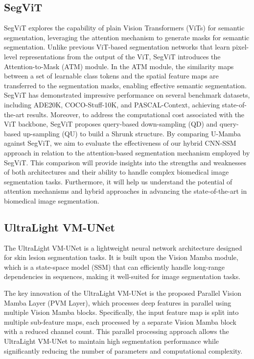\documentclass[conference]{IEEEtran}
\begin{document}
\subsection{SegViT}
SegViT \cite{zhang2022segvit} explores the capability of plain Vision Transformers (ViTs) \cite{dosovitskiy2021image} for semantic segmentation, leveraging the attention mechanism to generate masks for semantic segmentation. Unlike previous ViT-based segmentation networks that learn pixel-level representations from the output of the ViT, SegViT introduces the Attention-to-Mask (ATM) module. In the ATM module, the similarity maps between a set of learnable class tokens and the spatial feature maps are transferred to the segmentation masks, enabling effective semantic segmentation.
SegViT has demonstrated impressive performance on several benchmark datasets, including ADE20K, COCO-Stuff-10K, and PASCAL-Context, achieving state-of-the-art results. Moreover, to address the computational cost associated with the ViT backbone, SegViT proposes query-based down-sampling (QD) and query-based up-sampling (QU) to build a Shrunk structure. By comparing U-Mamba against SegViT, we aim to evaluate the effectiveness of our hybrid CNN-SSM approach in relation to the attention-based segmentation mechanism employed by SegViT. This comparison will provide insights into the strengths and weaknesses of both architectures and their ability to handle complex biomedical image segmentation tasks. Furthermore, it will help us understand the potential of attention mechanisms and hybrid approaches in advancing the state-of-the-art in biomedical image segmentation.

\subsection{UltraLight VM-UNet}
The UltraLight VM-UNet \cite{ultralightvmunet} is a lightweight neural network architecture designed for skin lesion segmentation tasks. It is built upon the Vision Mamba module, which is a state-space model (SSM) that can efficiently handle long-range dependencies in sequences, making it well-suited for image segmentation tasks.

The key innovation of the UltraLight VM-UNet is the proposed Parallel Vision Mamba Layer (PVM Layer), which processes deep features in parallel using multiple Vision Mamba blocks. Specifically, the input feature map is split into multiple sub-feature maps, each processed by a separate Vision Mamba block with a reduced channel count. This parallel processing approach allows the UltraLight VM-UNet to maintain high segmentation performance while significantly reducing the number of parameters and computational complexity.
\end{document}
